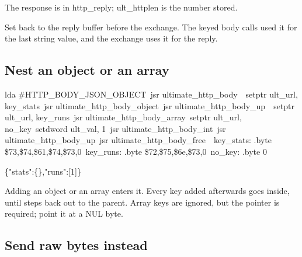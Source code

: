 \begin{resultbox}
The response is in http_reply; ult_httplen is the number stored.
\end{resultbox}

Set  back to the reply buffer before the exchange. The keyed body
calls used it for the last string value, and the exchange uses it for the
reply.

\subsection*{Nest an object or an array}

\begin{listingbox}
\hspace*{2em}lda \#HTTP\_BODY\_JSON\_OBJECT\
\hspace*{2em}jsr ultimate\_http\_body\
\
\hspace*{2em}setptr ult\_url, key\_stats\
\hspace*{2em}jsr ultimate\_http\_body\_object\
\hspace*{2em}jsr ultimate\_http\_body\_up\
\
\hspace*{2em}setptr ult\_url, key\_runs\
\hspace*{2em}jsr ultimate\_http\_body\_array\
\hspace*{2em}setptr ult\_url, no\_key\
\hspace*{2em}setdword ult\_val, 1\
\hspace*{2em}jsr ultimate\_http\_body\_int\
\hspace*{2em}jsr ultimate\_http\_body\_up\
\hspace*{2em}jsr ultimate\_http\_body\_free\
\
key\_stats: .byte \$73,\$74,\$61,\$74,\$73,0\
key\_runs:  .byte \$72,\$75,\$6e,\$73,0\
no\_key:    .byte 0
\end{listingbox}

\begin{resultbox}
\{"stats":\{\},"runs":[1]\}
\end{resultbox}

Adding an object or an array enters it. Every key added afterwards goes inside,
until \cmd{ultimate\_http\_body\_up} steps back out to the parent. Array keys
are ignored, but the pointer is required; point it at a NUL byte.

\subsection*{Send raw bytes instead}

